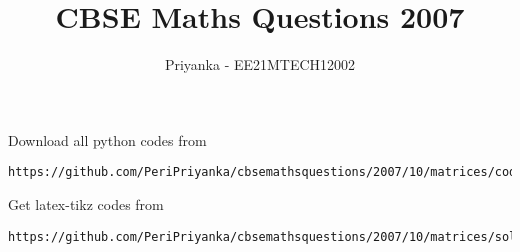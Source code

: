 \documentclass[journal,12pt,twocolumn]{IEEEtran}
\begin{document}
     \def\rightbox#1{\makebox[0in][r]{#1}}
     \def\centbox#1{\makebox[0in]{#1}}
     \def\topbox#1{\raisebox{-\baselineskip}[0in][0in]{#1}}
     \def\midbox#1{\raisebox{-0.5\baselineskip}[0in][0in]{#1}}
\vspace{3cm}
\title{CBSE Maths Questions 2007}
\author{Priyanka - EE21MTECH12002}
\maketitle
\newpage
\bigskip
\renewcommand{\thefigure}{\theenumi}
\renewcommand{\thetable}{\theenumi}
Download all python codes from 
\begin{lstlisting}
https://github.com/PeriPriyanka/cbsemathsquestions/2007/10/matrices/codes/solutions
\end{lstlisting}
%
Get latex-tikz codes from 
%
\begin{lstlisting}
https://github.com/PeriPriyanka/cbsemathsquestions/2007/10/matrices/solutions
\end{lstlisting}
\end{document}
